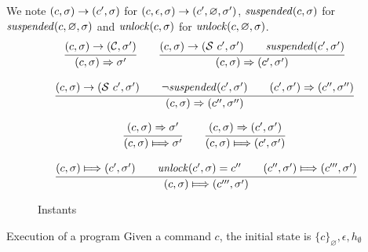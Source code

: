 We note $(c,\sigma) \rightarrow (c', \sigma)$ for $(c,\epsilon,\sigma) \rightarrow (c',\varnothing,\sigma')$,
${\mathit{suspended}}(c,\sigma)$ for ${\mathit{suspended}}(c,\varnothing,\sigma)$ and
${\mathit{unlock}}(c,\sigma)$ for ${\mathit{unlock}}(c,\varnothing,\sigma)$.
$$
  \begin{array}{c}
    \cfrac{
      (c,\sigma) \rightarrow ({\mathcal{C}},\sigma')
    }{
      (c,\sigma) \Rightarrow \sigma'
    }
    \qquad
    \cfrac{
      (c,\sigma) \rightarrow ({\mathcal{S}}~c',\sigma') \qquad
      {\mathit{suspended}} (c',\sigma')
    }{
      (c,\sigma) \Rightarrow (c', \sigma')
    }
    \\\\
    \cfrac{
      (c,\sigma) \rightarrow ({\mathcal{S}}~c',\sigma') \qquad
      \neg {\mathit{suspended}} (c',\sigma') \qquad (c',\sigma') \Rightarrow (c'',\sigma'')
    }{
      (c,\sigma) \Rightarrow (c'', \sigma'')
    }
  \end{array}
$$
\begin{figure}
  $$
    \begin{array}{c}
      \cfrac{
        (c,\heap) \Rightarrow \heap'
      }{
        (c,\heap) \Longmapsto \heap'
      }
      \qquad
      \cfrac{
        (c,\heap) \Rightarrow (c',\heap')
      }{
        (c,\heap) \Longmapsto (c', \heap')
      }
      \\\\\
      \cfrac{
        (c,\heap) \Longmapsto (c', \heap') \qquad \unlock(c',\heap) = c'' \qquad (c'', \heap') \Longmapsto (c''',\heap')
      }{
        (c,\heap) \Longmapsto (c''', \heap')
      }
    \end{array}
  $$
  \label{fig:instants}
  \caption{Instants}
\end{figure}
\begin{paragraph}{Execution of a program}
  Given a command $c$, the initial state is $\{c\}_\varnothing,\epsilon,h_\emptyset$
\end{paragraph}